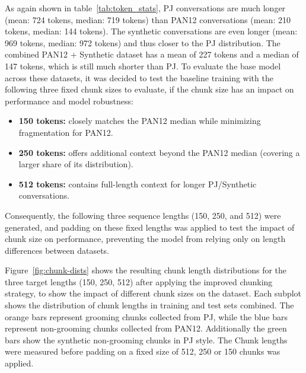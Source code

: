 As again shown in table~\ref{tab:token_stats}, PJ conversations are much longer (mean: 724 tokens, median: 719 tokens) than PAN12 conversations (mean: 210 tokens, median: 144 tokens). The synthetic conversations are even longer (mean: 969 tokens, median: 972 tokens) and thus closer to the PJ distribution. The combined PAN12 + Synthetic dataset has a mean of 227 tokens and a median of 147 tokens, which is still much shorter than PJ. 
To evaluate the base model across these datasets, it was decided to test the baseline training with the following three fixed chunk sizes to evaluate, if the chunk size has an impact on performance and model robustness:
\begin{itemize}
  \item \textbf{150 tokens:} closely matches the PAN12 median while minimizing fragmentation for PAN12.
  \item \textbf{250 tokens:} offers additional context beyond the PAN12 median (covering a larger share of its distribution).
  \item \textbf{512 tokens:} contains full-length context for longer PJ/Synthetic conversations.
\end{itemize}

Consequently, the following three sequence lengths (150, 250, and 512) were generated, and padding on these fixed lengths was applied to test the impact of chunk size on performance, preventing the model from relying only on length differences between datasets.


Figure~\ref{fig:chunk-dists} shows the resulting chunk length distributions for the three target lengths (150, 250, 512) after applying the improved chunking strategy, to show the impact of different chunk sizes on the dataset. Each subplot shows the distribution of chunk lengths in training and test sets combined. The orange bars represent grooming chunks collected from PJ, while the blue bars represent non-grooming chunks collected from PAN12. Additionally the green bars show the synthetic non-grooming chunks in PJ style. The Chunk lengths were measured before padding on a fixed size of 512, 250 or 150 chunks was applied.



